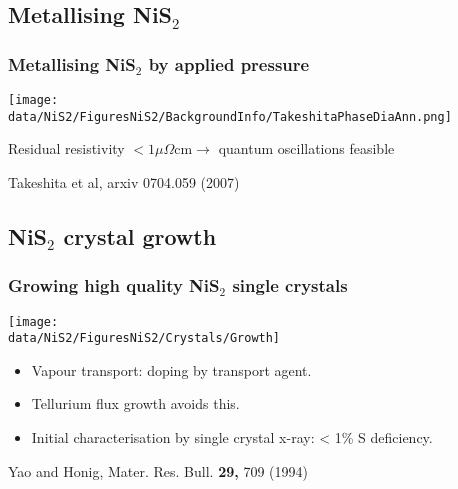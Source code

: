 \subsection{Metallising NiS$_2$}
\begin{frame}[label=NiS2-2]
\frametitle{Metallising NiS$_2$ by applied pressure}

\centerline{\texttt{[image: \\data/NiS2/FiguresNiS2/BackgroundInfo/TakeshitaPhaseDiaAnn.png]}}

\centerline{Residual resistivity $< 1 \mu\Omega \text{cm}  \rightarrow$ quantum oscillations feasible}
\vspace*{\fill}
\vspace{-0.25em}
\centerline{\makebox[\linewidth]{\rule{0.85\textwidth}{0.4pt}}}
\centerline{\scriptsize Takeshita et al, arxiv 0704.059 (2007)}
\end{frame}

\subsection{NiS$_2$ crystal growth}
\begin{frame}[label=NiS2Growth]
\frametitle{Growing high quality NiS$_2$ single crystals}

\centerline{\texttt{[image: \\data/NiS2/FiguresNiS2/Crystals/Growth]}}

\begin{itemize}
\item
Vapour transport: doping by transport agent.
\item 
Tellurium flux growth avoids this. %
\item
Initial characterisation by single crystal x-ray: < 1\% S deficiency.
\end{itemize}
\vspace*{\fill}
\vspace{-0.25em}
\centerline{\makebox[\linewidth]{\rule{0.85\textwidth}{0.4pt}}}
\centerline{\scriptsize Yao and Honig, Mater. Res. Bull. {\bf 29,} 709
  (1994)}
\end{frame}

